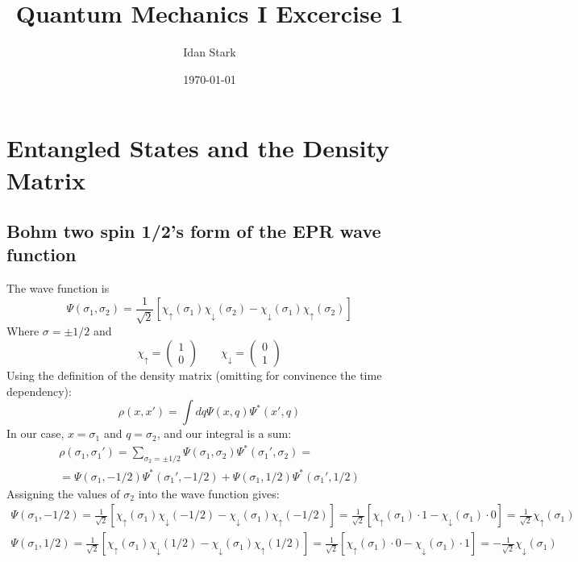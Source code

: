 \documentclass{article}
\title{Quantum Mechanics I Excercise 1}
\author{Idan Stark}
\date{\today}
\begin{document}
\maketitle
\section{Entangled States and the Density Matrix}
\label{sec:ex1}
\subsection{Bohm two spin 1/2’s form of the EPR wave function}
The wave function is
\begin{equation}
    \Psi(\sigma_1, \sigma_2) = \frac{1}{\sqrt{2}}[\chi_{\uparrow}(\sigma_1)\chi_{\downarrow}(\sigma_2) - \chi_{\downarrow}(\sigma_1)\chi_{\uparrow}(\sigma_2)]
\end{equation}
Where $\sigma = \pm 1/2$ and
\begin{equation}
    \chi_{\uparrow} = \begin{pmatrix} 1 \\ 0 \end{pmatrix} \qquad
    \chi_{\downarrow} = \begin{pmatrix} 0 \\ 1 \end{pmatrix}
\end{equation}
Using the definition of the density matrix (omitting for convinence the time dependency):
\begin{equation}
    \rho(x, x') = \int dq \Psi(x, q) \Psi^* (x', q)
\end{equation}
In our case, $x = \sigma_1$ and $q = \sigma_2$, and our integral is a sum:
\begin{equation}
\begin{gathered}
\label{rho}
    \rho(\sigma_1, \sigma_1') = \sum_{\sigma_2=\pm1/2}^{} \Psi(\sigma_1, \sigma_2) \Psi^* (\sigma_1', \sigma_2) = \\
    = \Psi(\sigma_1, -1/2) \Psi^* (\sigma_1', -1/2) + \Psi(\sigma_1, 1/2) \Psi^* (\sigma_1', 1/2)
\end{gathered}
\end{equation}
Assigning the values of $\sigma_2$ into the wave function gives:
\begin{equation}
\begin{gathered}
    \Psi(\sigma_1, -1/2) = \frac{1}{\sqrt{2}}[\chi_{\uparrow}(\sigma_1)\chi_{\downarrow}(-1/2) - \chi_{\downarrow}(\sigma_1)\chi_{\uparrow}(-1/2)] = \frac{1}{\sqrt{2}}[\chi_{\uparrow}(\sigma_1)\cdot1 - \chi_{\downarrow}(\sigma_1)\cdot0] = \frac{1}{\sqrt{2}}\chi_{\uparrow}(\sigma_1) \\
    \Psi(\sigma_1, 1/2) = \frac{1}{\sqrt{2}}[\chi_{\uparrow}(\sigma_1)\chi_{\downarrow}(1/2) - \chi_{\downarrow}(\sigma_1)\chi_{\uparrow}(1/2)] = \frac{1}{\sqrt{2}}[\chi_{\uparrow}(\sigma_1)\cdot0 - \chi_{\downarrow}(\sigma_1)\cdot1] = -\frac{1}{\sqrt{2}}\chi_{\downarrow}(\sigma_1)
\end{gathered}
\end{equation}
\end{document}
